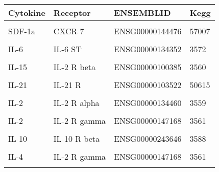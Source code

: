 \documentclass[11pt, a4paper, twosided]{book}
\begin{document}
\begin{table}
\centering
\begin{tabular}{l|l|l|l}
\hline
Cytokine & Receptor & ENSEMBLID & Kegg\\
\hline
\cellcolor[HTML]{E2E868}{SDF-1a} & \cellcolor[HTML]{E2E868}{CXCR 4} & \cellcolor[HTML]{E2E868}{ENSG00000121966} & \cellcolor[HTML]{E2E868}{7852}\\
\hline
SDF-1a & CXCR 7 & ENSG00000144476 & 57007\\
\hline
\cellcolor[HTML]{E2E868}{IL-6} & \cellcolor[HTML]{E2E868}{IL-6 R} & \cellcolor[HTML]{E2E868}{ENSG00000160712} & \cellcolor[HTML]{E2E868}{3570}\\
\hline
IL-6 & IL-6 ST & ENSG00000134352 & 3572\\
\hline
\cellcolor[HTML]{E2E868}{IL-15} & \cellcolor[HTML]{E2E868}{IL-15 R alpha} & \cellcolor[HTML]{E2E868}{ENSG00000134470} & \cellcolor[HTML]{E2E868}{3601}\\
\hline
IL-15 & IL-2 R beta & ENSG00000100385 & 3560\\
\hline
\cellcolor[HTML]{E2E868}{IL-15} & \cellcolor[HTML]{E2E868}{IL-2 R gamma} & \cellcolor[HTML]{E2E868}{ENSG00000147168} & \cellcolor[HTML]{E2E868}{3561}\\
\hline
IL-21 & IL-21 R & ENSG00000103522 & 50615\\
\hline
\cellcolor[HTML]{E2E868}{IL-21} & \cellcolor[HTML]{E2E868}{IL-21 R gamma} & \cellcolor[HTML]{E2E868}{ENSG00000147168} & \cellcolor[HTML]{E2E868}{3561}\\
\hline
IL-2 & IL-2 R alpha & ENSG00000134460 & 3559\\
\hline
\cellcolor[HTML]{E2E868}{IL-2} & \cellcolor[HTML]{E2E868}{IL-2 R beta} & \cellcolor[HTML]{E2E868}{ENSG00000100385} & \cellcolor[HTML]{E2E868}{3560}\\
\hline
IL-2 & IL-2 R gamma & ENSG00000147168 & 3561\\
\hline
\cellcolor[HTML]{E2E868}{IL-10} & \cellcolor[HTML]{E2E868}{IL-10 R alpha} & \cellcolor[HTML]{E2E868}{ENSG00000110324} & \cellcolor[HTML]{E2E868}{3587}\\
\hline
IL-10 & IL-10 R beta & ENSG00000243646 & 3588\\
\hline
\cellcolor[HTML]{E2E868}{IL-4} & \cellcolor[HTML]{E2E868}{IL-4 R} & \cellcolor[HTML]{E2E868}{ENSG00000077238} & \cellcolor[HTML]{E2E868}{3566}\\
\hline
IL-4 & IL-2 R gamma & ENSG00000147168 & 3561\\
\hline
\cellcolor[HTML]{E2E868}{IL-4} & \cellcolor[HTML]{E2E868}{IL-13 R A1} & \cellcolor[HTML]{E2E868}{ENSG00000131724} & \cellcolor[HTML]{E2E868}{3597}\\

\end{tabular}
\end{table}
\end{document}
